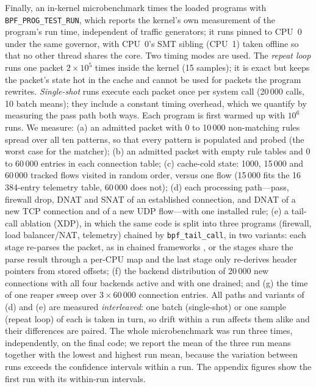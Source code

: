 \documentclass[conference]{IEEEtran}
\begin{document}
Finally, an in-kernel microbenchmark times the loaded programs with
\texttt{BPF\_PROG\_TEST\_RUN}, which reports the kernel's own measurement of
the program's run time, independent of traffic generators; it runs pinned to
CPU~0 under the same governor, with CPU~0's SMT sibling (CPU~1) taken offline
so that no other thread shares the core. Two timing modes are used. The \emph{repeat
loop} runs one packet $2\times10^5$ times inside the kernel (15 samples); it
is exact but keeps the packet's state hot in the cache and cannot be used for
packets the program rewrites. \emph{Single-shot} runs execute each packet once
per system call (20\,000 calls, 10 batch means); they include a constant
timing overhead, which we quantify by measuring the pass path both ways. Each
program is first warmed up with $10^6$ runs. We
measure: (a) an admitted packet with 0 to 10\,000 non-matching rules spread
over all ten patterns, so that every pattern is populated and probed (the
worst case for the matcher); (b) an admitted packet with empty rule tables
and 0 to 60\,000 entries in each connection table; (c) cache-cold state: 1000, 15\,000 and 60\,000 tracked
flows visited in random order, versus one flow (15\,000 fits the
16\,384-entry telemetry table, 60\,000 does not); (d) each processing
path---pass, firewall drop, DNAT and SNAT of an established connection, and
DNAT of a new TCP connection and of a new UDP flow---with one installed rule;
(e) a tail-call ablation (XDP), in which the same code is split into three
programs (firewall, load balancer/NAT, telemetry) chained by
\texttt{bpf\_tail\_call}, in two variants: each stage re-parses the packet,
as in chained frameworks \cite{miano2021polycube}, or the stages share the
parse result through a per-CPU map and the last stage only re-derives header
pointers from stored offsets; (f) the
backend distribution of 20\,000 new connections with all four backends
active and with one drained; and (g) the time of one reaper sweep over
$3\times60\,000$ connection entries. All paths and variants of (d) and (e)
are measured \emph{interleaved}: one batch (single-shot) or one sample
(repeat loop) of each is taken in turn, so drift within a run affects them
alike and their differences are paired. The whole microbenchmark was run
three times, independently, on the final code; we report the mean of the
three run means together with the lowest and highest run mean, because the
variation between runs exceeds the confidence intervals within a run. The
appendix figures show the first run with its within-run intervals.
\end{document}
